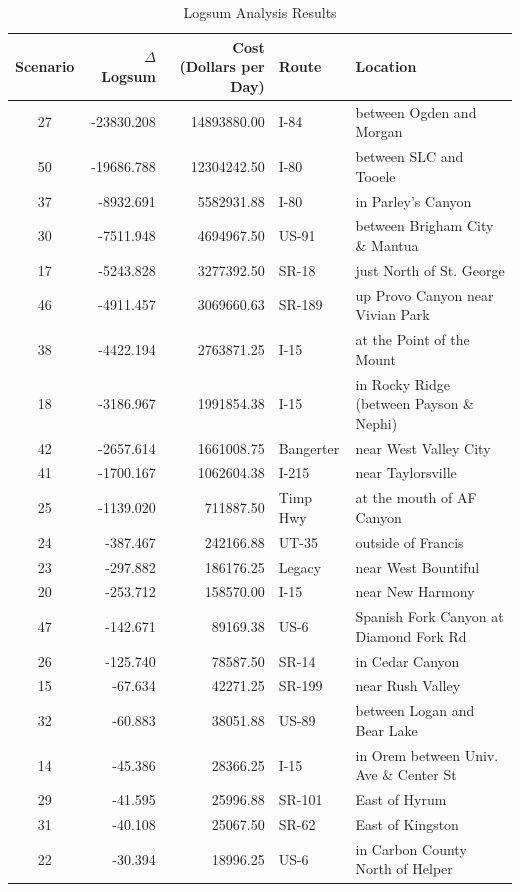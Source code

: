 \begin{table}


\caption{\label{tab:linkresults}Logsum Analysis Results}
\centering
\begin{tabular}[t]{crrll}
\toprule
Scenario & $\Delta$ Logsum & \makecell{Cost \\(Dollars per Day)} & Route & Location\\
\midrule
27 & -23830.208 & 14893880.00 & I-84 & between Ogden and Morgan\\
50 & -19686.788 & 12304242.50 & I-80 & between SLC and Tooele\\
37 & -8932.691 & 5582931.88 & I-80 & in Parley's Canyon\\
30 & -7511.948 & 4694967.50 & US-91 & between Brigham City \& Mantua\\
17 & -5243.828 & 3277392.50 & SR-18 & just North of St. George\\
46 & -4911.457 & 3069660.63 & SR-189 & up Provo Canyon near Vivian Park\\
38 & -4422.194 & 2763871.25 & I-15 & at the Point of the Mount\\
18 & -3186.967 & 1991854.38 & I-15 & in Rocky Ridge (between Payson \& Nephi)\\
42 & -2657.614 & 1661008.75 & Bangerter & near West Valley City\\
41 & -1700.167 & 1062604.38 & I-215 & near Taylorsville\\
25 & -1139.020 & 711887.50 & Timp Hwy & at the mouth of AF Canyon\\
24 & -387.467 & 242166.88 & UT-35 & outside of Francis\\
23 & -297.882 & 186176.25 & Legacy & near West Bountiful\\
20 & -253.712 & 158570.00 & I-15 & near New Harmony\\
47 & -142.671 & 89169.38 & US-6 & Spanish Fork Canyon at Diamond Fork Rd\\
26 & -125.740 & 78587.50 & SR-14 & in Cedar Canyon\\
15 & -67.634 & 42271.25 & SR-199 & near Rush Valley\\
32 & -60.883 & 38051.88 & US-89 & between Logan and Bear Lake\\
14 & -45.386 & 28366.25 & I-15 & in Orem between Univ. Ave \& Center St\\
29 & -41.595 & 25996.88 & SR-101 & East of Hyrum\\
31 & -40.108 & 25067.50 & SR-62 & East of Kingston\\
22 & -30.394 & 18996.25 & US-6 & in Carbon County North of Helper\\

\end{tabular}
\end{table}
